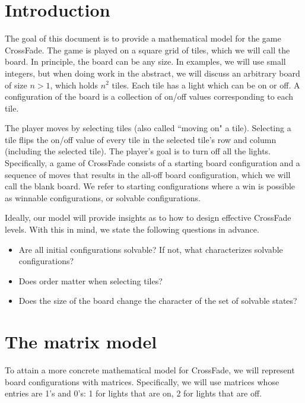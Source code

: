 \documentclass{article}[12pt]
\begin{document}
\section*{Introduction}

The goal of this document is to provide a mathematical model for the game CrossFade.  The game is played on a square grid of tiles, which we will call the board.  In principle, the board can be any size.  In examples, we will use small integers, but when doing work in the abstract, we will discuss an arbitrary board of size $n > 1$, which holds $n^2$ tiles.  Each tile has a light which can be on or off.  A configuration of the board is a collection of on/off values corresponding to each tile.

The player moves by selecting tiles (also called ``moving on" a tile).  Selecting a tile flips the on/off value of every tile in the selected tile's row and column (including the selected tile).  The player's goal is to turn off all the lights.  Specifically, a game of CrossFade consists of a starting board configuration and a sequence of moves that results in the all-off board configuration, which we will call the blank board.  We refer to starting configurations where a win is possible as winnable configurations, or solvable configurations.

Ideally, our model will provide insights as to how to design effective CrossFade levels.  With this in mind, we state the following questions in advance.

\begin{itemize}

\item Are all initial configurations solvable?  If not, what characterizes solvable configurations?

\item Does order matter when selecting tiles?

\item Does the size of the board change the character of the set of solvable states?

\end{itemize}

\section{The matrix model}

To attain a more concrete mathematical model for CrossFade, we will represent board configurations with matrices.  Specifically, we will use matrices whose entries are 1's and 0's: 1 for lights that are on, 2 for lights that are off.
\end{document}
